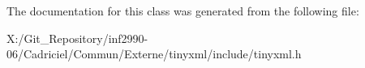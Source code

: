 The documentation for this class was generated from the following file\-:\begin{DoxyCompactItemize}
\item 
X\-:/\-Git\-\_\-\-Repository/inf2990-\/06/\-Cadriciel/\-Commun/\-Externe/tinyxml/include/tinyxml.\-h\end{DoxyCompactItemize}
